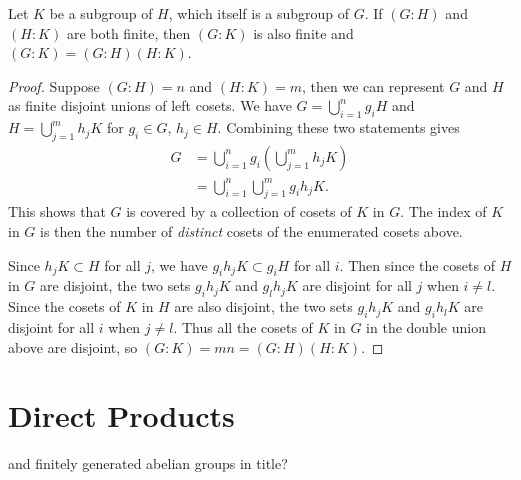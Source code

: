 \documentclass[10pt]{report}
\begin{document}
\begin{prop}
	Let $K$ be a subgroup of $H$, which itself is a subgroup of $G$. If $(G:H)$ and $(H:K)$ are both finite, then $(G:K)$ is also finite and $(G:K)=(G:H)(H:K)$.
\end{prop}
\begin{proof}
	Suppose $(G:H)=n$ and $(H:K)=m$, then we can represent $G$ and $H$ as finite disjoint unions of left cosets. We have $G = \bigcup_{i=1}^n g_i H$ and $H = \bigcup_{j=1}^m h_j K$ for $g_i \in G$, $h_j\in H$. Combining these two statements gives
	\begin{align*}
		G &= \bigcup_{i=1}^n g_i \left( \bigcup_{j=1}^m h_j K \right) \\
		  &= \bigcup_{i=1}^n \bigcup_{j=1}^m g_i h_j K.
	\end{align*}
	This shows that $G$ is covered by a collection of cosets of $K$ in $G$. The index of $K$ in $G$ is then the number of \textit{distinct} cosets of the enumerated cosets above.

	Since $h_j K \subset H$ for all $j$, we have $g_i h_j K \subset g_i H$ for all $i$. Then since the cosets of $H$ in $G$ are disjoint, the two sets $g_i h_j K$ and $g_l h_j K$ are disjoint for all $j$ when $i \neq l$. Since the cosets of $K$ in $H$ are also disjoint, the two sets $g_i h_j K$ and $g_i h_l K$ are disjoint for all $i$ when $j \neq l$. Thus all the cosets of $K$ in $G$ in the double union above are disjoint, so $(G:K) = m n = (G:H) (H:K)$.
\end{proof}


\section{Direct Products}

{\color{red}and finitely generated abelian groups in title?}
\end{document}
